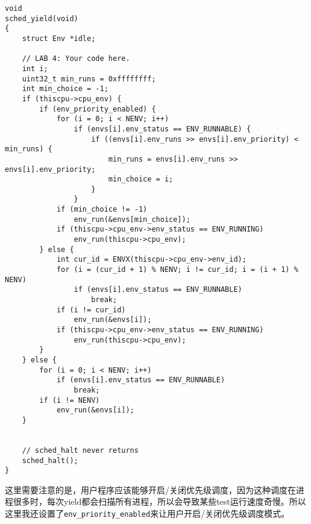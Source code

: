 \documentclass[11pt]{article}
\begin{document}
\begin{lstlisting}[title=kern/sched.c]
void
sched_yield(void)
{
	struct Env *idle;

	// LAB 4: Your code here.
	int i;
	uint32_t min_runs = 0xffffffff;
	int min_choice = -1;
	if (thiscpu->cpu_env) {
		if (env_priority_enabled) {
			for (i = 0; i < NENV; i++)
				if (envs[i].env_status == ENV_RUNNABLE) {
					if ((envs[i].env_runs >> envs[i].env_priority) < min_runs) {
						min_runs = envs[i].env_runs >> envs[i].env_priority;
						min_choice = i;
					}
				}
			if (min_choice != -1)
				env_run(&envs[min_choice]);
			if (thiscpu->cpu_env->env_status == ENV_RUNNING)
				env_run(thiscpu->cpu_env);
		} else {
			int cur_id = ENVX(thiscpu->cpu_env->env_id);
			for (i = (cur_id + 1) % NENV; i != cur_id; i = (i + 1) % NENV)
				if (envs[i].env_status == ENV_RUNNABLE)
					break;
			if (i != cur_id)
				env_run(&envs[i]);
			if (thiscpu->cpu_env->env_status == ENV_RUNNING)
				env_run(thiscpu->cpu_env);
		}
	} else {
		for (i = 0; i < NENV; i++)
			if (envs[i].env_status == ENV_RUNNABLE)
				break;
		if (i != NENV)
			env_run(&envs[i]);
	}
	

	// sched_halt never returns
	sched_halt();
}
\end{lstlisting}
这里需要注意的是，用户程序应该能够开启/关闭优先级调度，因为这种调度在进程很多时，每次yield都会扫描所有进程，所以会导致某些test运行速度奇慢。所以这里我还设置了\lstinline|env_priority_enabled|来让用户开启/关闭优先级调度模式。
\end{document}
